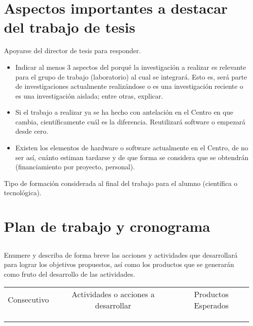 \documentclass[runningheads,a4paper]{book}
\begin{document}
\section{Aspectos importantes a destacar del trabajo de tesis}
Apoyarse del director de tesis para responder.
\begin{itemize}
\settowidth{\leftmargin}{{\Large$\circ$}}\advance\leftmargin{}
\itemsep8pt\relax
\renewcommand\labelitemi{{\lower1.5pt\hbox{\Large$\circ$}}}
 \item Indicar al menos 3 aspectos del porqué la investigación a realizar es relevante para el grupo de trabajo (laboratorio) al cual se integrará. Esto es, será parte de investigaciones actualmente realizándose o es una investigación reciente o es una investigación aislada; entre otras, explicar.
 \item Si el trabajo a realizar ya se ha hecho con antelación en el Centro en que cambia, científicamente cuál es la diferencia. Reutilizará software o empezará desde cero.
 \item Existen los elementos de hardware o software actualmente en el Centro, de no ser así, cuánto estiman tardarse y de que forma se considera que se obtendrán (financiamiento por proyecto, personal).
\end{itemize}
Tipo de formación considerada al final del trabajo para el alumno (científica o tecnológica).


\section{Plan de trabajo y cronograma}
\subsection{ }
Enumere y describa de forma breve las acciones y actividades que desarrollará para lograr los objetivos propuestos, así como los productos que se generarán como fruto del desarrollo de las actividades. 
\begin{table}
\begin{center}
 \begin{tabular}{|c|c|c|}
\hline\noalign{\smallskip}
Consecutivo & Actividades o acciones a desarrollar & Productos Esperados\\
\noalign{\smallskip}
\hline
\noalign{\smallskip}
 &  &  \\\hline
 &  &  \\\hline
 &  &  \\
\hline
\end{tabular}
\end{center}
\end{table}
\end{document}
